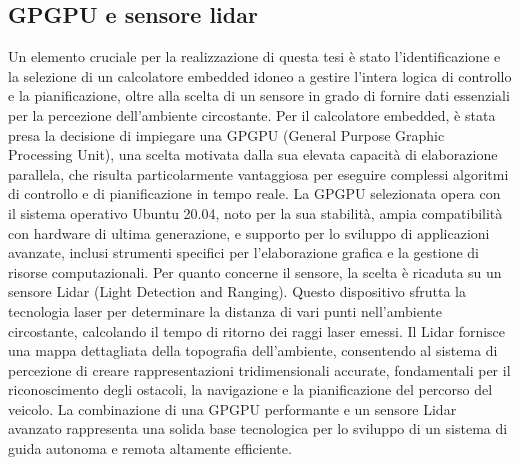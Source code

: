 \subsection{GPGPU e sensore lidar}
Un elemento cruciale per la realizzazione di questa tesi è stato l'identificazione e la selezione di un calcolatore embedded idoneo a gestire l'intera logica di controllo e la pianificazione, oltre alla scelta di un sensore in grado di fornire dati essenziali per la percezione dell'ambiente circostante.
\noindent Per il calcolatore embedded, è stata presa la decisione di impiegare una GPGPU (General Purpose Graphic Processing Unit), una scelta motivata dalla sua elevata capacità di elaborazione parallela, che risulta particolarmente vantaggiosa per eseguire complessi algoritmi di controllo e di pianificazione in tempo reale. La GPGPU selezionata opera con il sistema operativo Ubuntu 20.04, noto per la sua stabilità, ampia compatibilità con hardware di ultima generazione, e supporto per lo sviluppo di applicazioni avanzate, inclusi strumenti specifici per l'elaborazione grafica e la gestione di risorse computazionali.
\noindent Per quanto concerne il sensore, la scelta è ricaduta su un sensore Lidar (Light Detection and Ranging). Questo dispositivo sfrutta la tecnologia laser per determinare la distanza di vari punti nell'ambiente circostante, calcolando il tempo di ritorno dei raggi laser emessi. Il Lidar fornisce una mappa dettagliata della topografia dell'ambiente, consentendo al sistema di percezione di creare rappresentazioni tridimensionali accurate, fondamentali per il riconoscimento degli ostacoli, la navigazione e la pianificazione del percorso del veicolo. La combinazione di una GPGPU performante e un sensore Lidar avanzato rappresenta una solida base tecnologica per lo sviluppo di un sistema di guida autonoma e remota altamente efficiente.

